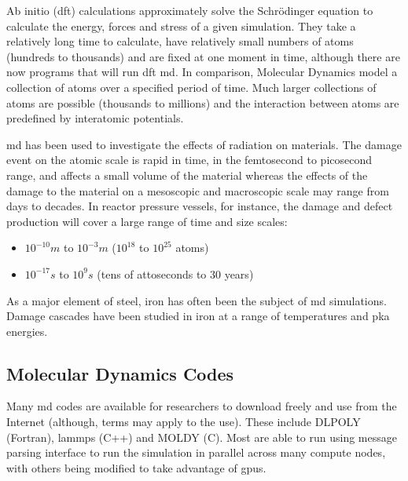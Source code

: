 Ab initio (\acrshort{dft}) calculations approximately solve the Schr\"{o}dinger equation to calculate the energy, forces and stress of a given simulation.  They take a relatively long time to calculate, have relatively small numbers of atoms (hundreds to thousands) and are fixed at one moment in time, although there are now programs that will run \acrshort{dft} \acrshort{md}.  In comparison, Molecular Dynamics model a collection of atoms over a specified period of time.  Much larger collections of atoms are possible (thousands to millions) and the interaction between atoms are predefined by interatomic potentials.

\Acrlong{md} has been used to investigate the effects of radiation on materials.  The damage event on the atomic scale is rapid in time, in the femtosecond to picosecond range, and affects a small volume of the material whereas the effects of the damage to the material on a mesoscopic and macroscopic scale may range from days to decades.  In reactor pressure vessels, for instance, the damage and defect production will cover a large range of time and size scales\cite{damagebcciron}:

\begin{itemize}
\item $10^{-10}m$ to $10^{-3}m$ ($10^{18}$ to $10^{25}$ atoms)
\item $10^{-17}s$ to $10^{9}s$ (tens of attoseconds to 30 years)
\end{itemize}

As a major element of steel, iron has often been the subject of \acrshort{md} simulations.  Damage cascades have been studied in iron at a range of temperatures and \acrshort{pka} energies.



\subsection{Molecular Dynamics Codes}

Many \acrshort{md} codes are available for researchers to download freely and use from the Internet (although, terms may apply to the use).  These include DLPOLY (Fortran), \acrlong{lammps} (C++) and MOLDY (C).  Most are able to run using message parsing interface to run the simulation in parallel across many compute nodes, with others being modified to take advantage of \acrlong{gpu}s.

